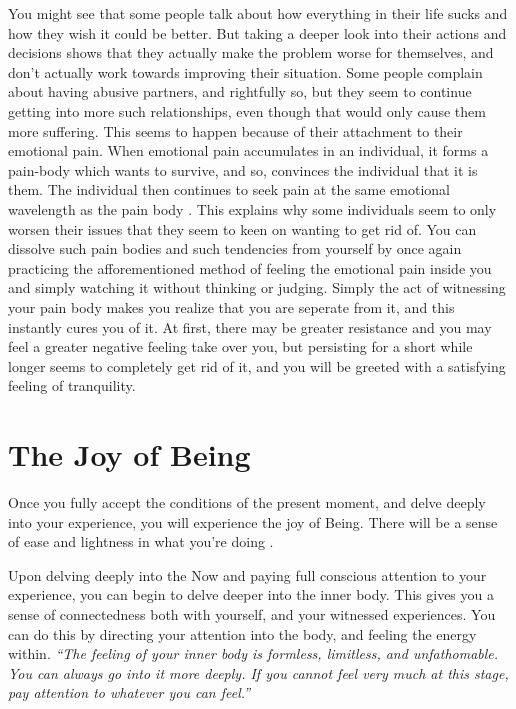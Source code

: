 \documentclass[
]{book}
\begin{document}
You might see that some people talk about how everything in their life sucks and how they wish it could be better. But taking a deeper look into their actions and decisions shows that they actually make the problem worse for themselves, and don't actually work towards improving their situation. Some people complain about having abusive partners, and rightfully so, but they seem to continue getting into more such relationships, even though that would only cause them more suffering. This seems to happen because of their attachment to their emotional pain. When emotional pain accumulates in an individual, it forms a pain-body which wants to survive, and so, convinces the individual that it is them. The individual then continues to seek pain at the same emotional wavelength as the pain body \citep{painbody}. This explains why some individuals seem to only worsen their issues that they seem to keen on wanting to get rid of. You can dissolve such pain bodies and such tendencies from yourself by once again practicing the afforementioned method of feeling the emotional pain inside you and simply watching it without thinking or judging. Simply the act of witnessing your pain body makes you realize that you are seperate from it, and this instantly cures you of it. At first, there may be greater resistance and you may feel a greater negative feeling take over you, but persisting for a short while longer seems to completely get rid of it, and you will be greeted with a satisfying feeling of tranquility.

\hypertarget{the-joy-of-being}{%
\section{The Joy of Being}\label{the-joy-of-being}}

Once you fully accept the conditions of the present moment, and delve deeply into your experience, you will experience the joy of Being. There will be a sense of ease and lightness in what you're doing \citep{acceptance2}.

Upon delving deeply into the Now and paying full conscious attention to your experience, you can begin to delve deeper into the inner body. This gives you a sense of connectedness both with yourself, and your witnessed experiences. You can do this by directing your attention into the body, and feeling the energy within. \emph{``The feeling of your inner body is formless, limitless, and unfathomable. You can always go into it more deeply. If you cannot feel very much at this stage, pay attention to whatever you can feel.''}
\end{document}
